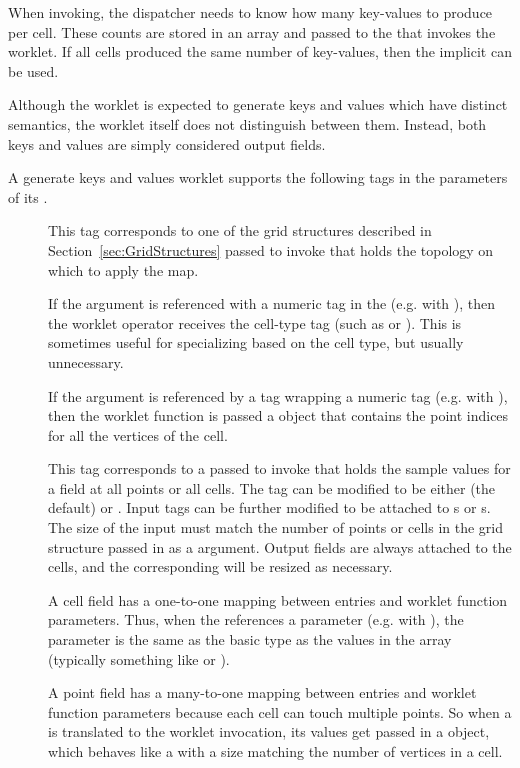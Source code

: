 When invoking, the dispatcher needs to know how many key-values to produce
per cell. These counts are stored in an array and passed to the
 that invokes the worklet. If all
cells produced the same number of key-values, then the implicit
 can be used.

Although the  worklet is expected to
generate keys and values which have distinct semantics, the worklet itself
does not distinguish between them. Instead, both keys and values are simply
considered output fields.

A generate keys and values worklet supports the following tags in the
parameters of its \controlsignature.
\begin{description}
\item[] This tag corresponds to one of the grid structures
  described in Section~\ref{sec:GridStructures} passed to invoke that holds
  the topology on which to apply the map.

  If the  argument is referenced with a numeric tag in the
  \executionsignature (e.g. with ), then the worklet operator
  receives the cell-type tag (such as  or
  ). This is sometimes useful for specializing   based
  on the cell type, but usually unnecessary.

  If the  argument is referenced by a 
  tag wrapping a numeric tag (e.g. with ), then
  the worklet function is passed a  object that
  contains the point indices for all the vertices of the cell.
\item[] This tag corresponds to a 
  passed to invoke that holds the sample values for a field at all points
  or all cells. The  tag can be modified to be either
   (the default) or . Input  tags can
  be further modified to be attached to s or
  s. The size of the input  must match
  the number of points or cells in the grid structure passed in as a
   argument.  Output fields are always attached to the
  cells, and the corresponding  will be resized as
  necessary.

  A cell field has a one-to-one mapping between 
  entries and worklet function parameters. Thus, when the
  \executionsignature references a \controlsignature {}
  parameter (e.g. with ), the parameter is the same as the
  basic type as the values in the array (typically something like
   or ).

  A point field has a many-to-one mapping between 
  entries and worklet function parameters because each cell can touch
  multiple points. So when a  is translated to the
  worklet invocation, its values get passed in a 
  object, which behaves like a  with a size matching the number
  of vertices in a cell.
\end{description}

